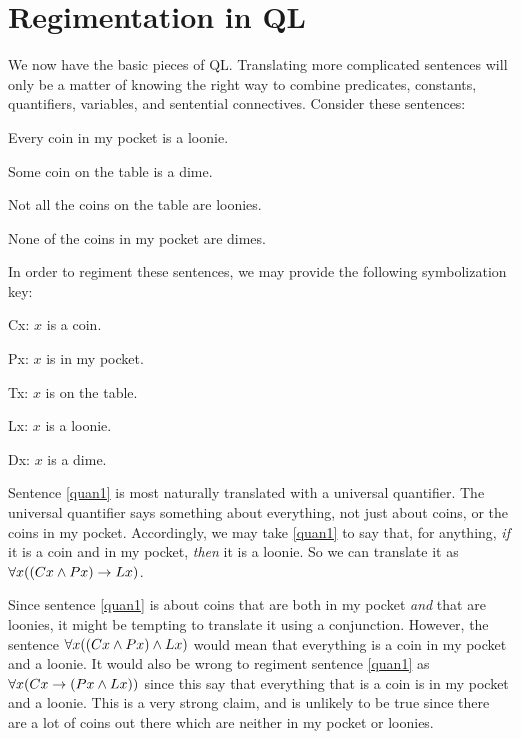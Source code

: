 \section{Regimentation in QL}

We now have the basic pieces of QL.
Translating more complicated sentences will only be a matter of knowing the right way to combine predicates, constants, quantifiers, variables, and sentential connectives.
Consider these sentences:

\begin{earg}
\item[\ex{quan1}] Every coin in my pocket is a loonie.
\item[\ex{quan2}] Some coin on the table is a dime.
\item[\ex{quan3}] Not all the coins on the table are loonies.
\item[\ex{quan4}] None of the coins in my pocket are dimes.
\end{earg}

In order to regiment these sentences, we may provide the following symbolization key:

\begin{ekey}
\item[Cx:] $x$ is a coin.
\item[Px:] $x$ is in my pocket.
\item[Tx:] $x$ is on the table.
\item[Lx:] $x$ is a loonie.
\item[Dx:] $x$ is a dime.
\end{ekey}

Sentence \ref{quan1} is most naturally translated with a universal quantifier.
The universal quantifier says something about everything, not just about coins, or the coins in my pocket.
Accordingly, we may take \ref{quan1} to say that, for anything, \textit{if} it is a coin and in my pocket, \textit{then} it is a loonie.
So we can translate it as $\forall x((Cx \wedge Px) \rightarrow Lx)$.

Since sentence \ref{quan1} is about coins that are both in my pocket \emph{and} that are loonies, it might be tempting to translate it using a conjunction.
However, the sentence $\forall x((Cx \wedge Px) \wedge Lx)$ would mean that everything is a coin in my pocket and a loonie.
It would also be wrong to regiment sentence \ref{quan1} as $\forall x(Cx \rightarrow (Px \wedge Lx))$ since this say that everything that is a coin is in my pocket and a loonie. 
This is a very strong claim, and is unlikely to be true since there are a lot of coins out there which are neither in my pocket or loonies.

